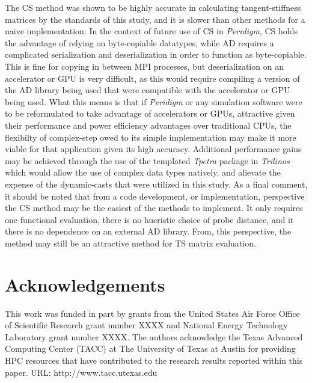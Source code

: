 \documentclass[preprint,12pt]{elsarticle}
\begin{document}
The CS method was shown to be highly accurate in calculating tangent-stiffness matrices by the standards of this study, and it is slower than other methods for a naive implementation. In the context of future use of CS in \emph{Peridigm}, CS holds the advantage of relying on byte-copiable datatypes, while AD requires a complicated serialization and deserialization in order to function as byte-copiable. This is fine for copying in between MPI processes, but deserialization on an accelerator or GPU is very difficult, as this would require compiling a version of the AD library being used that were compatible with the accelerator or GPU being used. What this means is that if \emph{Peridigm} or any simulation software were to be reformulated to take advantage of accelerators or GPUs, attractive given their performance and power efficiency advantages over traditional CPUs, the flexibilty of complex-step owed to its simple implementation may make it more viable for that application given its high accuracy. Additional performance gains may be achieved through the use of the templated \emph{Tpetra} package in \emph{Trilinos} which would allow the use of complex data types natively, and alievate the expense of the dynamic-casts that were utilized in this study.  As a final comment, it should be noted that from a code development, or implementation, perspective the CS method may be the easiest of the methods to implement. It only requires one functional evaluation, there is no hueristic choice of probe distance, and it there is no dependence on an external AD library.  From, this perspective, the method may still be an attractive method for TS matrix evaluation.




\section{Acknowledgements}
\label{sec:ack}
This work was funded in part by grants from the United States Air Force Office of Scientific Research grant number XXXX  and National Energy Technology Laboratory grant number XXXX. The authors acknowledge the Texas Advanced Computing Center (TACC) at The University of Texas at Austin for providing HPC resources that have contributed to the research results reported within this paper. URL: http://www.tacc.utexas.edu
\end{document}
